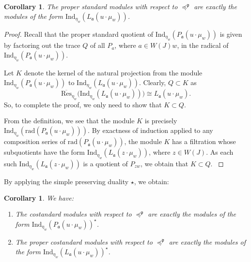 \documentclass[a4paper]{amsart}
\newtheorem{corollary}[theorem]{Corollary}
\begin{document}
\begin{corollary}\label{cor-pr-std}
The proper standard modules with respect to ${\preceq^\mathfrak{p}}$
are exactly the modules of the form 
$\mathrm{Ind}_{\eta_w}(L_\mathfrak{a}(u\cdot \mu_w))$.
\end{corollary}

\begin{proof}
Recall that the proper standard quotient of 
$\mathrm{Ind}_{\eta_w}(P_\mathfrak{a}(u\cdot \mu_w))$
is given by factoring out the trace $Q$ of all 
$P_a$, where $a\in W(J)w$, in the radical
of $\mathrm{Ind}_{\eta_w}(P_\mathfrak{a}(u\cdot \mu_w))$.

Let $K$ denote the kernel of the natural projection from the 
module
$\mathrm{Ind}_{\eta_w}(P_\mathfrak{a}(u\cdot \mu_w))$
to $\mathrm{Ind}_{\eta_w}(L_\mathfrak{a}(u\cdot \mu_w))$.
Clearly, $Q\subset K$ as 
\begin{displaymath}
\overline{\mathrm{Res}}_{\eta_w}
\big(\mathrm{Ind}_{\eta_w}(L_\mathfrak{a}(u\cdot \mu_w))\big)
\cong L_\mathfrak{a}(u\cdot \mu_w).
\end{displaymath}
So, to complete the proof, we only need to show that 
$K\subset Q$.

{
From the definition, we see that the module $K$ is precisely 
$\mathrm{Ind}_{\eta_w}(\mathrm{rad}(P_{\mathfrak a} (u\cdot\mu_w)))$.
By exactness of induction applied to any composition series of
$\mathrm{rad}(P_{\mathfrak a} (u\cdot\mu_w))$, the module
$K$ has a filtration  whose subquotients have the form
$\mathrm{Ind}_{\eta_w}(L_\mathfrak{a}(z\cdot \mu_w))$,
where $z\in W(J)$. As each such 
$\mathrm{Ind}_{\eta_w}(L_\mathfrak{a}(z\cdot \mu_w))$
is a quotient of $P_{zw}$, we obtain that $K\subset Q$.
}
\end{proof}

By applying the simple preserving duality $\star$, we obtain:

\begin{corollary}\label{cor-costd}
We have:

\begin{enumerate}[$($a$)$]
\item\label{cor-costd.1} The costandard modules with respect 
to ${\preceq^\mathfrak{p}}$ are exactly the modules of the form 
$\mathrm{Ind}_{\eta_w}(P_\mathfrak{a}(u\cdot \mu_w))^\star$.
\item\label{cor-costd.2} The proper costandard modules with respect 
to ${\preceq^\mathfrak{p}}$ are exactly the modules of the form 
$\mathrm{Ind}_{\eta_w}(L_\mathfrak{a}(u\cdot \mu_w))^\star$.
\end{enumerate}
\end{corollary}
\end{document}
